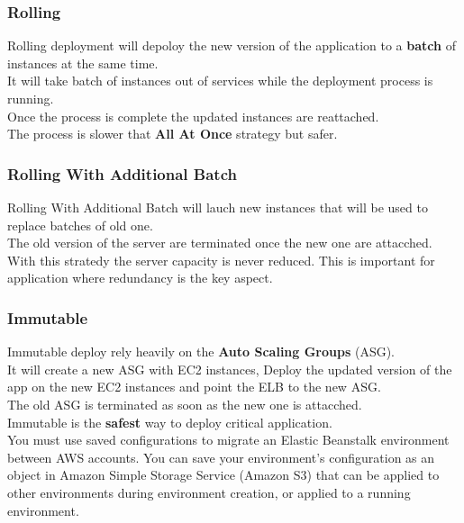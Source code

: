 \documentclass[12pt, letterpaper, twoside]{article}
\begin{document}
\subsubsection{Rolling}
Rolling deployment will depoloy the new version of the application to a \textbf{batch} of
instances at the same time.\\
It will take batch of instances out of services while the deployment process is running.\\
Once the process is complete the updated instances are reattached.\\
The process is slower that \textbf{All At Once} strategy but safer.\\

\subsubsection{Rolling With Additional Batch}
Rolling With Additional Batch will lauch new instances that will be used to replace batches
of old one.\\
The old version of the server are terminated once the new one are attacched.\\

With this stratedy the server capacity is never reduced. This is important for application
where redundancy is the key aspect.\\

\subsubsection{Immutable}
Immutable deploy rely heavily on the \textbf{Auto Scaling Groups} (ASG).\\
It will create a new ASG with EC2 instances, Deploy the updated version of the app on the
new EC2 instances and point the ELB to the new ASG.\\
The old ASG is terminated as soon as the new one is attacched.\\
Immutable is the \textbf{safest} way to deploy critical application.\\

You must use saved configurations to migrate an Elastic Beanstalk environment between AWS accounts. 
You can save your environment's configuration as an object in Amazon Simple Storage Service (Amazon S3) 
that can be applied to other environments during environment creation, or applied to a running environment.\\
\end{document}
